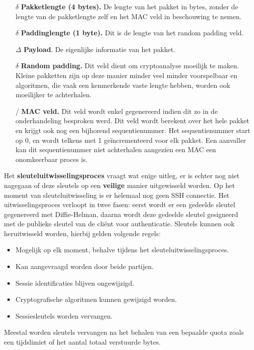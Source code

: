 \documentclass{report}
\begin{document}
	\begin{itemize}
		\item[$\delta$] \textbf{Pakketlengte (4 bytes).} De lengte van het pakket in bytes, zonder de lengte van de pakketlengte zelf en het MAC veld in beschouwing te nemen.
		\item[$\delta$] \textbf{Paddinglengte (1 byte).} Dit is de lengte van het random padding veld.
		\item[$\Delta$] \textbf{Payload}. De eigenlijke informatie van het pakket.
		\item[$\delta$] \textbf{Random padding.} Dit veld dient om cryptoanalyse moeilijk te maken. Kleine pakketten zijn op deze manier minder veel minder voorspelbaar en algoritmen, die vaak een kenmerkende vaste lengte hebben, worden ook moeilijker te achterhalen.
		\item[/] \textbf{MAC veld.} Dit veld wordt enkel gegenereerd indien dit zo in de onderhandeling besproken werd. Dit veld wordt berekent over het hele pakket en krijgt ook nog een bijhorend sequentienummer. Het sequentienummer start op 0, en wordt telkens met 1 geïncrementeerd voor elk pakket. Een aanvaller kan dit sequentienummer niet achterhalen aangezien een MAC een onomkeerbaar proces is.
	\end{itemize}

	Het \textbf{sleuteluitwisselingsproces} vraagt wat enige uitleg, er is echter nog niet nagegaan of deze sleutels op een \textbf{veilige} manier uitgewisseld worden. Op het moment van sleuteluitwisseling is er helemaal nog geen SSH connectie. Het uitwisselingsproces verloopt in twee fasen: eerst wordt er een gedeelde sleutel gegenereerd met Diffie-Helman, daarna wordt deze gedeelde sleutel gesigneerd met de publieke sleutel van de cliënt voor authenticatie. Sleutels kunnen ook heruitwisseld worden, hierbij gelden volgende regels:
	\begin{itemize}
		\item Mogelijk op elk moment, behalve tijdens het sleuteluitwisselingsproces.
		\item Kan aangevraagd worden door beide partijen.
		\item Sessie identificaties blijven ongewijzigd.
		\item Cryptografische algoritmen kunnen gewijzigd worden.
		\item Sessiesleutels worden vervangen.
	\end{itemize}
	Meestal worden sleutels vervangen na het behalen van een bepaalde quota zoals een tijdslimiet of het aantal totaal verstuurde bytes.
\end{document}
